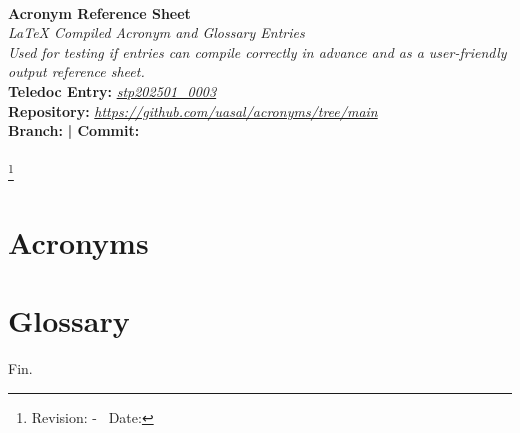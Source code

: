 \documentclass[12pt]{book}
\def\title{Acronym Reference Sheet}
\def\subtitle{LaTeX Compiled Acronym and Glossary Entries}
\def\info{Used for testing if entries can compile correctly in advance and as a user-friendly output reference sheet.}
\def\repourl{\url{https://github.com/uasal/acronyms/tree/main}}
\def\teledoc{\href{https://teledocs.space/docs/stp202501_0003}{stp202501\_0003}}
\edef\gitBranch{\gitBranch}
\begin{document}
    \renewcommand{\maketitle}{
	\pagestyle{empty}
	\thispagestyle{empty}
	\begin{center}
		\vspace{0.5cm} \mbox{}\hrulefill \mbox{}\\[1cm]
     		{\Huge \textbf{\title}\\[1cm]}
     			{\Large \textit{\subtitle}}\\[3cm]
			{\large \textit{\info}}\\[5cm]
			{\small \textbf{Teledoc Entry: }\textit{\teledoc}}\\[0.3cm]
            		{\small \textbf{Repository: }\textit{\repourl}}\\[0.5cm]
			{\small \textbf{Branch: } \gitBranch}
			{\small \textbf{  |  Commit:} \gitDescribe}\\[0.5cm]
     		{\small \mbox{}\hrulefill\mbox{}\\[10mm]}
            \footnote{{ Revision: \gitAbbrevHash - \gitDirty\ Date: \gitCommitterDate}}
  	\end{center}
	\pagestyle{fancy}
}

\maketitle

\setcounter{secnumdepth}{4}
\setcounter{tocdepth}{2}
\tableofcontents
	

\glsaddall
\chapter{Acronyms}
\printglossary[type=\acronymtype]
\chapter{Glossary}
\printglossary[type=term]

Fin.
\end{document}
